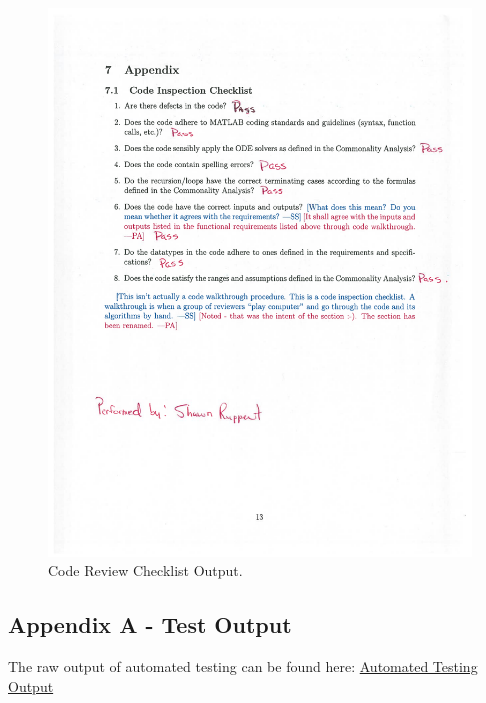 \documentclass[12pt, titlepage]{article}
\begin{document}
\begin{figure}[H]
 \includegraphics[width=\linewidth]{checklistoutput}
  \caption{Code Review Checklist Output.}
  \label{fig:CCO}
\end{figure}





\newpage
\begin{landscape}
\section{Appendix A - Test Output} \label{app_a}

The raw output of automated testing can be found here:
\href{https://github.com/aoananp/cas741/blob/master/Doc/TestReport/automatedtestoutput.txt}{Automated Testing Output}\\


\end{landscape}
\end{document}
